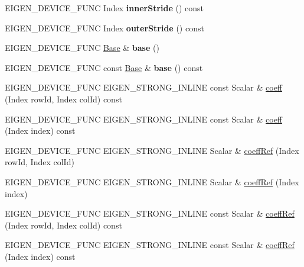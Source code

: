 \begin{DoxyCompactItemize}
E\+I\+G\+E\+N\+\_\+\+D\+E\+V\+I\+C\+E\+\_\+\+F\+U\+NC Index {\bfseries inner\+Stride} () const
\item 
\mbox{\label{class_eigen_1_1_array_a5423645ae6ff529326dff1ab23cb9e70}} 
E\+I\+G\+E\+N\+\_\+\+D\+E\+V\+I\+C\+E\+\_\+\+F\+U\+NC Index {\bfseries outer\+Stride} () const
\item 
\mbox{\label{class_eigen_1_1_array_a322485a0bc534ee24b8ce5c0df68ab50}} 
E\+I\+G\+E\+N\+\_\+\+D\+E\+V\+I\+C\+E\+\_\+\+F\+U\+NC \mbox{\hyperlink{class_eigen_1_1_plain_object_base}{Base}} \& {\bfseries base} ()
\item 
\mbox{\label{class_eigen_1_1_array_a323e8a05899b309009eab82a52d21e86}} 
E\+I\+G\+E\+N\+\_\+\+D\+E\+V\+I\+C\+E\+\_\+\+F\+U\+NC const \mbox{\hyperlink{class_eigen_1_1_plain_object_base}{Base}} \& {\bfseries base} () const
\item 
E\+I\+G\+E\+N\+\_\+\+D\+E\+V\+I\+C\+E\+\_\+\+F\+U\+NC E\+I\+G\+E\+N\+\_\+\+S\+T\+R\+O\+N\+G\+\_\+\+I\+N\+L\+I\+NE const Scalar \& \mbox{\hyperlink{class_eigen_1_1_array_afbfc12954f16d21aedb7bd839f64a278}{coeff}} (Index row\+Id, Index col\+Id) const
\item 
E\+I\+G\+E\+N\+\_\+\+D\+E\+V\+I\+C\+E\+\_\+\+F\+U\+NC E\+I\+G\+E\+N\+\_\+\+S\+T\+R\+O\+N\+G\+\_\+\+I\+N\+L\+I\+NE const Scalar \& \mbox{\hyperlink{class_eigen_1_1_array_af592e3993ea3d4ac9f073b42db2c04cc}{coeff}} (Index index) const
\item 
E\+I\+G\+E\+N\+\_\+\+D\+E\+V\+I\+C\+E\+\_\+\+F\+U\+NC E\+I\+G\+E\+N\+\_\+\+S\+T\+R\+O\+N\+G\+\_\+\+I\+N\+L\+I\+NE Scalar \& \mbox{\hyperlink{class_eigen_1_1_array_a25626a55b26a4323565f79d1b7c48ea8}{coeff\+Ref}} (Index row\+Id, Index col\+Id)
\item 
E\+I\+G\+E\+N\+\_\+\+D\+E\+V\+I\+C\+E\+\_\+\+F\+U\+NC E\+I\+G\+E\+N\+\_\+\+S\+T\+R\+O\+N\+G\+\_\+\+I\+N\+L\+I\+NE Scalar \& \mbox{\hyperlink{class_eigen_1_1_array_a571632ed666076d7403c8bd3eece44f0}{coeff\+Ref}} (Index index)
\item 
E\+I\+G\+E\+N\+\_\+\+D\+E\+V\+I\+C\+E\+\_\+\+F\+U\+NC E\+I\+G\+E\+N\+\_\+\+S\+T\+R\+O\+N\+G\+\_\+\+I\+N\+L\+I\+NE const Scalar \& \mbox{\hyperlink{class_eigen_1_1_array_ab1b33ee10e4c72ec5cf354d511900e62}{coeff\+Ref}} (Index row\+Id, Index col\+Id) const
\item 
E\+I\+G\+E\+N\+\_\+\+D\+E\+V\+I\+C\+E\+\_\+\+F\+U\+NC E\+I\+G\+E\+N\+\_\+\+S\+T\+R\+O\+N\+G\+\_\+\+I\+N\+L\+I\+NE const Scalar \& \mbox{\hyperlink{class_eigen_1_1_array_a982b56223d011e2f836a3408983883d4}{coeff\+Ref}} (Index index) const
\end{DoxyCompactItemize}
